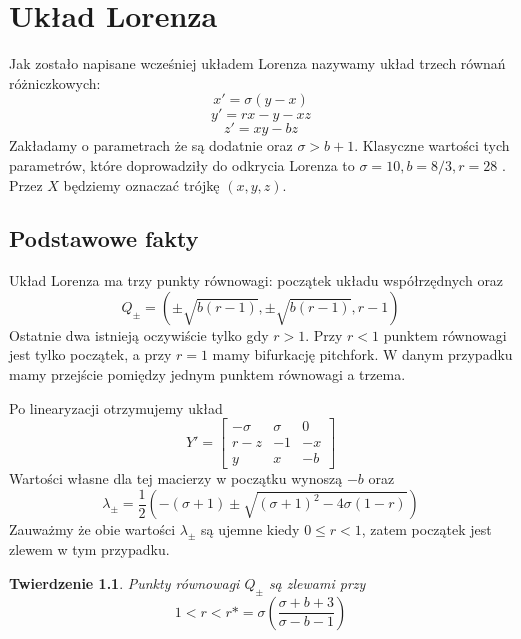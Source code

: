 \documentclass[12pt]{report}
\newtheorem{theorem}{Twierdzenie}
\begin{document}
\chapter{Układ Lorenza}
	\par Jak zostało napisane wcześniej układem Lorenza nazywamy układ trzech równań różniczkowych:
		\[ x' = \sigma (y - x) \]
		\[ y' = rx - y - xz \]
		\[ z' = xy - bz \]
	Zakładamy o parametrach że są dodatnie oraz $\sigma > b + 1$. Klasyczne wartości tych parametrów, które doprowadziły do odkrycia Lorenza to $\sigma = 10, b = 8/3, r = 28$ \cite{Lorenz}. Przez $X$ będziemy oznaczać trójkę $(x, y, z)$.

	\section{Podstawowe fakty}
	\par Układ Lorenza ma trzy punkty równowagi: początek układu współrzędnych oraz
		\[ Q_{\pm} = (\pm \sqrt{b(r - 1)}, \pm \sqrt{b(r - 1)}, r - 1) \]
	Ostatnie dwa istnieją oczywiście tylko gdy $r > 1$. Przy $r < 1$ punktem równowagi jest tylko początek, a przy $r = 1$ mamy bifurkację pitchfork. W danym przypadku mamy przejście pomiędzy jednym punktem równowagi a trzema.
	
	\par Po linearyzacji otrzymujemy układ
		\[ Y' = \begin{bmatrix}
					-\sigma & \sigma & 0 \\
					r-z & -1 & -x \\
					y & x & -b
				\end{bmatrix}
		\]
	Wartości własne dla tej macierzy w początku wynoszą $-b$ oraz
		\[ \lambda_{\pm} = \frac{1}{2} (-(\sigma + 1) \pm \sqrt{(\sigma + 1)^2 - 4\sigma (1 - r)}) \]
	Zauważmy że obie wartości $\lambda_{\pm}$ są ujemne kiedy $0 \le r < 1$, zatem początek jest zlewem w tym przypadku.
	\begin{theorem}
		Punkty równowagi $Q_{\pm}$ są zlewami przy
		\[ 1 < r < r* = \sigma (\frac{\sigma + b + 3}{\sigma - b - 1}) \]
	\end{theorem}
	
\end{document}
